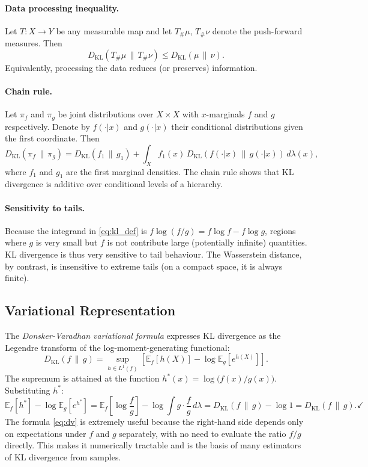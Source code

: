 \documentclass[12pt]{article}
\newcommand{\KL}[2]{D_{\mathrm{KL}}\!\left(#1\,\|\,#2\right)}
\newcommand{\E}[2]{\mathbb{E}_{#1}\!\left[#2\right]}
\begin{document}
\paragraph{Data processing inequality.}
Let $T: X \to Y$ be any measurable map and let $T_\#\mu$,
$T_\#\nu$ denote the push-forward measures.  Then
\begin{equation}\label{eq:dpi}
  \KL{T_\#\mu}{T_\#\nu} \leq \KL{\mu}{\nu}.
\end{equation}
Equivalently, processing the data reduces (or preserves)
information.

\paragraph{Chain rule.}
Let $\pi_f$ and $\pi_g$ be joint distributions over $X \times X$
with $x$-marginals $f$ and $g$ respectively.  Denote by
$f(\cdot|x)$ and $g(\cdot|x)$ their conditional distributions given
the first coordinate.  Then
\begin{equation}\label{eq:chainrule}
  \KL{\pi_f}{\pi_g}
  = \KL{f_1}{g_1}
  + \int_X f_1(x)\,\KL{f(\cdot|x)}{g(\cdot|x)}\,d\lambda(x),
\end{equation}
where $f_1$ and $g_1$ are the first marginal densities.  The
chain rule shows that KL divergence is additive over conditional
levels of a hierarchy.

\paragraph{Sensitivity to tails.}
Because the integrand in \eqref{eq:kl_def} is
$f \log(f/g) = f \log f - f \log g$, regions where $g$ is
very small but $f$ is not contribute large (potentially
infinite) quantities.  KL divergence is thus very sensitive to
tail behaviour.  The Wasserstein distance, by contrast, is
insensitive to extreme tails (on a compact space, it is always
finite).

\subsection{Variational Representation}
\label{sec:kl_var}

The \emph{Donsker-Varadhan variational formula}
\citep{DonskerVaradhan1975} expresses KL divergence as the
Legendre transform of the log-moment-generating functional:
\begin{equation}\label{eq:dv}
  \boxed{\KL{f}{g}
  = \sup_{h \in L^1(f)}
  \left[\E{f}{h(X)} - \log\E{g}{e^{h(X)}}\right].}
\end{equation}
The supremum is attained at the function $h^*(x) =
\log\bigl(f(x)/g(x)\bigr)$.  Substituting $h^*$:
\[
  \E{f}{h^*} - \log\E{g}{e^{h^*}}
  = \E{f}{\log\frac{f}{g}} - \log\int g\cdot\frac{f}{g}\,d\lambda
  = \KL{f}{g} - \log 1 = \KL{f}{g}. \checkmark
\]
The formula \eqref{eq:dv} is extremely useful because the right-hand
side depends only on expectations under $f$ and $g$ separately,
with no need to evaluate the ratio $f/g$ directly.  This makes it
numerically tractable and is the basis of many estimators of KL
divergence from samples.
\end{document}
